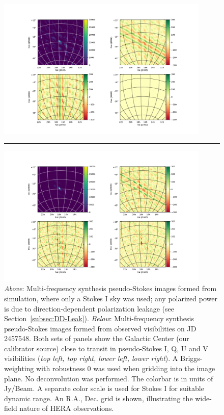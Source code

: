 \documentclass[twocolumn, trackchanges]{aastex61}
\begin{document}
\begin{figure}
\centering
\includegraphics[width=0.9\textwidth]{sim4pol.pdf}
\par\noindent\rule{0.8\textwidth}{0.4pt}
\includegraphics[width=0.9\textwidth]{new4pol.pdf}
\caption{
\textit{Above}: Multi-frequency synthesis pseudo-Stokes images formed from simulation, where only a Stokes I sky was used; any polarized power is due to direction-dependent polarization leakage (see Section~\ref{subsec:DD-Leak}).
\textit{Below}: Multi-frequency synthesis pseudo-Stokes images formed from observed visibilities on JD 2457548.
Both sets of panels show the Galactic Center (our calibrator source) close to transit in pseudo-Stokes I, Q, U and V visibilities (\textit{top left, top right, lower left, lower right}). A Briggs-weighting with robustness 0 was used when gridding into the image plane. No deconvolution was performed. The colorbar is in units of Jy/Beam.
A separate color scale is used for Stokes I for suitable dynamic range. An R.A., Dec. grid is shown, illustrating the wide-field nature of HERA observations.
}
\label{fig:GCimage}
\end{figure}
\end{document}
